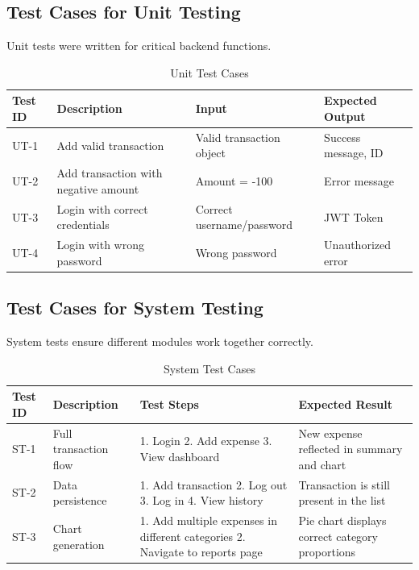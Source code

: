 \documentclass[12pt]{report}
\begin{document}
\subsection{Test Cases for Unit Testing}
Unit tests were written for critical backend functions.
\begin{table}[h!]
\centering
\caption{Unit Test Cases}
\label{tab:unit_tests}
\begin{tabular}{|p{2cm}|p{3cm}|p{3cm}|p{3cm}|}
\hline
\textbf{Test ID} & \textbf{Description} & \textbf{Input} & \textbf{Expected Output} \\ \hline
UT-1 & Add valid transaction & Valid transaction object & Success message, ID \\ \hline
UT-2 & Add transaction with negative amount & Amount = -100 & Error message \\ \hline
UT-3 & Login with correct credentials & Correct username/password & JWT Token \\ \hline
UT-4 & Login with wrong password & Wrong password & Unauthorized error \\ \hline
\end{tabular}
\end{table}

\subsection{Test Cases for System Testing}
System tests ensure different modules work together correctly.
\begin{table}[h!]
\centering
\caption{System Test Cases}
\label{tab:system_tests}
\begin{tabular}{|p{2cm}|p{3cm}|p{3cm}|p{3cm}|}
\hline
\textbf{Test ID} & \textbf{Description} & \textbf{Test Steps} & \textbf{Expected Result} \\ \hline
ST-1 & Full transaction flow & 1. Login 2. Add expense 3. View dashboard & New expense reflected in summary and chart \\ \hline
ST-2 & Data persistence & 1. Add transaction 2. Log out 3. Log in 4. View history & Transaction is still present in the list \\ \hline
ST-3 & Chart generation & 1. Add multiple expenses in different categories 2. Navigate to reports page & Pie chart displays correct category proportions \\ \hline
\end{tabular}
\end{table}

\newpage
\end{document}
